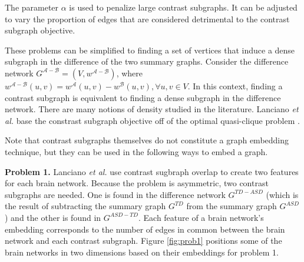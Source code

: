 \documentclass[sigconf]{acmart}
\begin{document}
The parameter $\alpha$ is used to penalize large contrast subgraphs.
It can be adjusted to vary the proportion of edges that are considered detrimental to the contrast subgraph objective.

These problems can be simplified to finding a set of vertices that induce a dense subgraph in the difference of the two summary graphs.
Consider the difference network  $G^{\mathcal{A} - \mathcal{B}} = (V, w^{\mathcal{A} - \mathcal{B}})$, where \\ $w^{\mathcal{A} - \mathcal{B}}(u,v) = w^{\mathcal{A}}(u,v) - w^{\mathcal{B}}(u,v), \forall u,v \in V$.
In this context, finding a contrast subgraph is equivalent to finding a dense subgraph in the difference network.
There are many notions of density studied in the literature.
Lanciano \emph{et al.} base the constrast subgraph objective off of the optimal quasi-clique problem \cite{tsourakakis2013}.

Note that contrast subgraphs themselves do not constitute a graph embedding technique, but they can be used in the following ways to embed a graph.

\textbf{Problem 1.}
Lanciano \emph{et al.} use contrast sugbraph overlap to create two features for each brain network.
Because the problem is asymmetric, two contrast subgraphs are needed.
One is found in the difference network $G^{TD - ASD}$ (which is the result of subtracting the summary graph $G^{TD}$ from the summary graph $G^{ASD}$) and the other is found in $G^{ASD - TD}$.
Each feature of a brain network's embedding corresponds to the number of edges in common between the brain network and each contrast subgraph.
Figure \ref{fig:prob1} positions some of the brain networks in two dimensions based on their embeddings for problem 1. 
\end{document}
